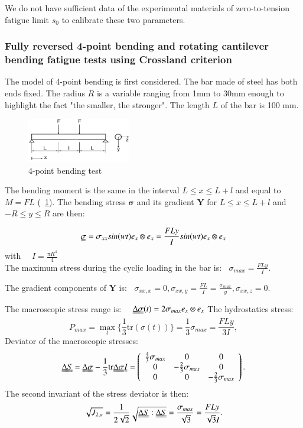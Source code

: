 \documentclass[3p,times,procedia,number]{elsarticle}
\newcommand{\figref}[1]{\figurename~\ref{#1}}
\begin{document}
We do not have sufficient data of the experimental materials of zero-to-tension fatigue limit $s_0$ to calibrate these two parameters.


\subsubsection{Fully reversed 4-point bending and rotating cantilever bending fatigue tests using Crossland criterion}
The model of 4-point bending is first considered. The bar made of steel has both ends fixed. The radius $R$ is a variable ranging from 1mm to 30mm enough to highlight the fact "the smaller, the stronger". The length $L$ of the bar is 100 mm.

\begin{figure}[h!]
	\centering
	\includegraphics[width=0.4\textwidth]{figures//fig11.jpg} 
	\caption{4-point bending test \cite{papadopoulos1996invariant} }
	\label{fig11}
\end{figure}

The bending moment is the same in the interval $L\leqslant x \leqslant L+l$ and equal to
$M = FL$ (\figref{fig11}). The bending stress $\bm{\sigma}$ and its gradient $\textbf{Y}$ for
$L\leqslant x \leqslant L+l$ and  $-R\leqslant y \leqslant R$ are then:

$$\uuline{\sigma}=\sigma_{xx}sin(wt)e_x\otimes e_x=\frac{FLy}{I}sin(wt) e_x\otimes e_x $$ 
with
$ \quad I=\frac{\pi R^4}{4}$\\
The maximum stress during the cyclic loading in the bar  is:
$\;\; \sigma_{max}=\frac{FLy}{I}$.

\noindent The gradient components of $\textbf{Y}$ is:
$\;\;\sigma_{xx,x}=0, \sigma_{xx,y}=\frac{FL}{I}=\frac{\sigma_{max}}{y},\sigma_{xx,z}=0$.

\noindent The macroscopic stress range is: $ \quad \uuline{\Delta\sigma}(t)=2\sigma_{max}e_x\otimes e_x $
The hydrostatics stress:
\begin{equation}
P_{max}=\max\limits_{t}\{\frac{1}{3}\textrm{tr}(\sigma(t))\}=\frac{1}{3}\sigma_{max}=\frac{FLy}{3I},
\end{equation}
Deviator of the macroscopic stresses:
\begin{equation} 
\uuline{\Delta S}=\uuline{\Delta\sigma}-\frac{1}{3}\textrm{tr}\uuline{\Delta\sigma}\uuline{I}=
\left(
\begin{array}{ccc}
\frac{4}{3}\sigma_{max} & 0 & 0\\
0 & -\frac{2}{3}\sigma_{max} & 0\\ 
0 & 0 & -\frac{2}{3}\sigma_{max}\\
\end{array}\right) .
\end{equation}
The second invariant of the stress deviator is then:
\begin{equation}
\sqrt{J_{2,a}}=\frac{1}{2\sqrt{2}}\sqrt{\uuline{\Delta S}:\uuline{\Delta S}}=\frac{\sigma_{max}}{\sqrt{3}} =\frac{FLy}{\sqrt{3}I} .
\end{equation}
\end{document}
